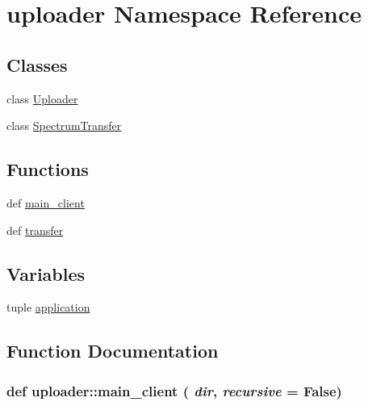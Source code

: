 \hypertarget{namespaceuploader}{
\section{uploader Namespace Reference}
\label{namespaceuploader}
}
\subsection*{Classes}
\begin{DoxyCompactItemize}
\item 
class \hyperlink{classuploader_1_1_uploader}{Uploader}
\item 
class \hyperlink{classuploader_1_1_spectrum_transfer}{SpectrumTransfer}
\end{DoxyCompactItemize}
\subsection*{Functions}
\begin{DoxyCompactItemize}
\item 
def \hyperlink{namespaceuploader_a6957812483a44332530f5a10854e34e8}{main\_\-client}
\item 
def \hyperlink{namespaceuploader_a118cbe977c15312bd15cb16999d48d8d}{transfer}
\end{DoxyCompactItemize}
\subsection*{Variables}
\begin{DoxyCompactItemize}
\item 
tuple \hyperlink{namespaceuploader_a84bbed69751228281d405bfe08a3cc1d}{application}
\end{DoxyCompactItemize}


\subsection{Function Documentation}
\hypertarget{namespaceuploader_a6957812483a44332530f5a10854e34e8}{
\subsubsection[{main\_\-client}]{\setlength{\rightskip}{0pt plus 5cm}def uploader::main\_\-client ( {\em dir}, \/   {\em recursive} = {\ttfamily False})}}
\label{namespaceuploader_a6957812483a44332530f5a10854e34e8}


